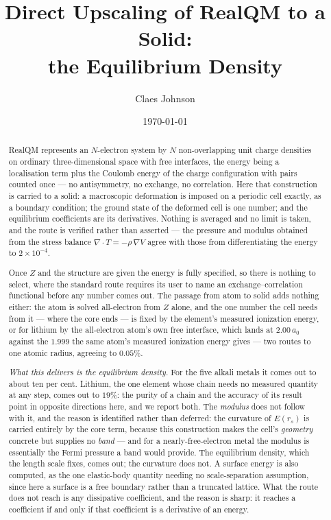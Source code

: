 \documentclass[11pt]{article}
\title{Direct Upscaling of RealQM to a Solid:\\the Equilibrium Density}
\author[1]{Claes Johnson}
\affil[1]{KTH Royal Institute of Technology, SE-100 44 Stockholm, Sweden \\
\small\texttt{claesjohnson@gmail.com}}
\date{\today}
\newcommand{\grad}{\nabla}
\begin{document}
\maketitle

\begin{abstract}
RealQM represents an $N$-electron system by $N$ non-overlapping unit charge densities on ordinary
three-dimensional space with free interfaces, the energy being a localisation term plus the Coulomb
energy of the charge configuration with pairs counted once --- no antisymmetry, no exchange, no
correlation. Here that construction is carried to a solid: a macroscopic deformation is imposed on a
periodic cell exactly, as a boundary condition; the ground state of the deformed cell is one number;
and the equilibrium coefficients are its derivatives. Nothing is averaged and no limit is taken, and
the route is verified rather than asserted --- the pressure and modulus obtained from the stress
balance $\grad\cdot T=-\rho\,\grad V$ agree with those from differentiating the energy to
$2\times10^{-4}$.

Once $Z$ and the structure are given the energy is fully specified, so there is nothing to select,
where the standard route requires its user to name an exchange--correlation functional before any
number comes out. The passage from atom to solid adds nothing either: the atom is solved
all-electron from $Z$ alone, and the one number the cell needs from it --- where the core ends --- is
fixed by the element's measured ionization energy, or for lithium by the all-electron atom's own
free interface, which lands at $2.00\,a_0$ against the $1.999$ the same atom's measured
ionization energy gives --- two routes to one atomic radius, agreeing to $0.05\%$.

\emph{What this delivers is the equilibrium density.} For the five alkali metals it comes out to
about ten per cent. Lithium, the one element whose chain needs no measured quantity at any step,
comes out to $19\%$: the purity of a chain and the accuracy of its result point in opposite
directions here, and we report both. The
\emph{modulus} does not follow with it, and the reason is identified rather than deferred: the
curvature of $E(r_s)$ is carried entirely by the core term, because this construction makes the
cell's \emph{geometry} concrete but supplies no \emph{band} --- and for a nearly-free-electron metal
the modulus is essentially the Fermi pressure a band would provide. The equilibrium density, which
the length scale fixes, comes out; the curvature does not. A surface
energy is also computed, as the one elastic-body quantity needing no scale-separation assumption,
since here a surface is a free boundary rather than a truncated lattice. What the route does not
reach is any dissipative coefficient, and the reason is sharp: it reaches a coefficient if and only
if that coefficient is a derivative of an energy.
\end{abstract}
\end{document}
